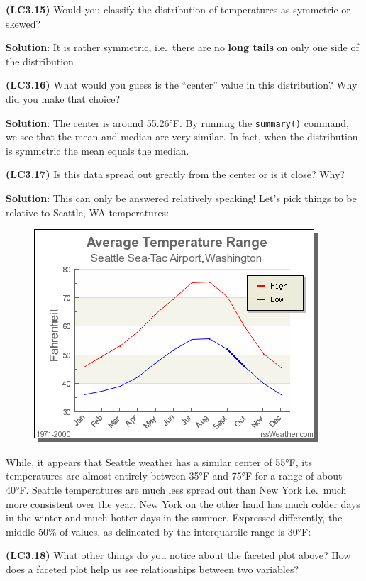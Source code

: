 \documentclass[12pt,]{krantz}
\theoremstyle{definition}
\theoremstyle{definition}
\theoremstyle{definition}
\theoremstyle{remark}
\begin{document}
\textbf{(LC3.15)} Would you classify the distribution of temperatures as
symmetric or skewed?

\textbf{Solution}: It is rather symmetric, i.e.~there are no
\textbf{long tails} on only one side of the distribution

\textbf{(LC3.16)} What would you guess is the ``center'' value in this
distribution? Why did you make that choice?

\textbf{Solution}: The center is around 55.26°F. By running the
\texttt{summary()} command, we see that the mean and median are very
similar. In fact, when the distribution is symmetric the mean equals the
median.

\textbf{(LC3.17)} Is this data spread out greatly from the center or is
it close? Why?

\textbf{Solution}: This can only be answered relatively speaking! Let's
pick things to be relative to Seattle, WA temperatures:

\begin{figure}
\centering
\includegraphics{images/temp.png}
\caption{}
\end{figure}

While, it appears that Seattle weather has a similar center of 55°F, its
temperatures are almost entirely between 35°F and 75°F for a range of
about 40°F. Seattle temperatures are much less spread out than New York
i.e.~much more consistent over the year. New York on the other hand has
much colder days in the winter and much hotter days in the summer.
Expressed differently, the middle 50\% of values, as delineated by the
interquartile range is 30°F:

\textbf{(LC3.18)} What other things do you notice about the faceted plot
above? How does a faceted plot help us see relationships between two
variables?
\end{document}
